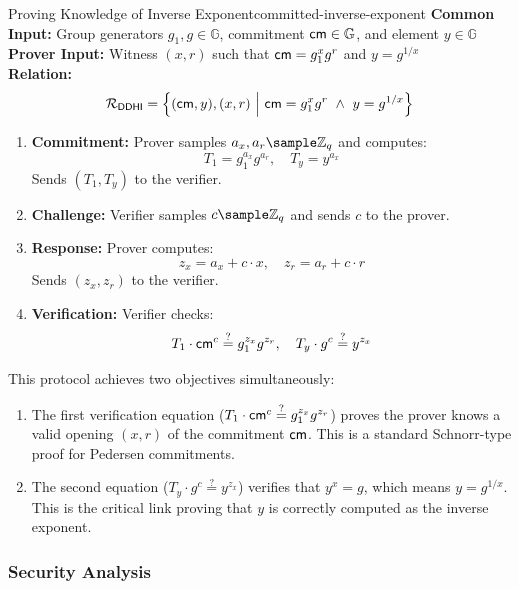\begin{protocol}{Proving Knowledge of Inverse Exponent}{committed-inverse-exponent}\label{pok-committed-inverse-exponent}
\textbf{Common Input:} Group generators $g_1, g \in \mathbb{G}$, commitment $\mathsf{cm} \in \mathbb{G}$, and element $y \in \mathbb{G}$ \\
\textbf{Prover Input:} Witness $(x, r)$ such that $\mathsf{cm} = g_1^x g^r$ and $y = g^{1/x}$ \\
\textbf{Relation:} 
\[
\mathcal{R}_{\mathsf{DDHI}} = \left\{ (\mathsf{cm}, y), (x, r) \ \middle|\ \mathsf{cm} = g_1^x g^r \ \land\ y = g^{1/x} \right\}
\]
\begin{enumerate}
    \item \textbf{Commitment:} Prover samples $a_x, a_r \sample \mathbb{Z}_q$ and computes:
    \[
    T_1 = g_1^{a_x} g^{a_r}, \quad T_y = y^{a_x}
    \]
    Sends $(T_1, T_y)$ to the verifier.

    \item \textbf{Challenge:} Verifier samples $c  \sample  \mathbb{Z}_q$ and sends $c$ to the prover.

    \item \textbf{Response:} Prover computes:
    \[
    z_x = a_x + c \cdot x, \quad z_r = a_r + c \cdot r
    \]
    Sends $(z_x, z_r)$ to the verifier.

    \item \textbf{Verification:} Verifier checks:
    \[
    T_1 \cdot \mathsf{cm}^c \stackrel{?}{=} g_1^{z_x} g^{z_r}, \quad T_y \cdot g^c \stackrel{?}{=} y^{z_x}
    \]
\end{enumerate}
\end{protocol}



This protocol achieves two objectives simultaneously:
\begin{enumerate}
    \item The first verification equation ($T_1 \cdot \mathsf{cm}^c \stackrel{?}{=} g_1^{z_x} g^{z_r}$) proves the prover knows a valid opening $(x, r)$ of the commitment $\mathsf{cm}$. This is a standard Schnorr-type proof for Pedersen commitments.
    
    \item The second equation ($T_y \cdot g^c \stackrel{?}{=} y^{z_x}$) verifies that $y^x = g$, which means $y = g^{1/x}$. This is the critical link proving that $y$ is correctly computed as the inverse exponent.
\end{enumerate}


\subsubsection{Security Analysis}


